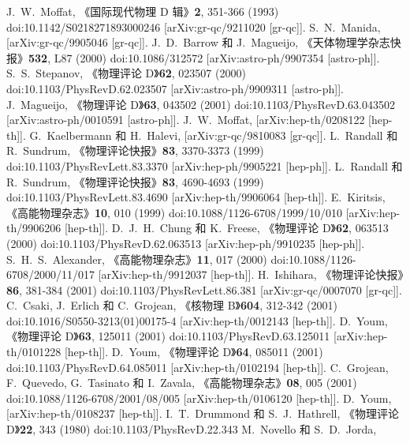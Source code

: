 \documentclass[jkps,preprint,fleqn]{revtex4}
\begin{document}
\begin{CJK*}{UTF8}{gbsn}
\begin{thebibliography}{999}
J.~W.~Moffat,
《国际现代物理 D 辑》\textbf{2}, 351-366 (1993)
doi:10.1142/S0218271893000246
[arXiv:gr-qc/9211020 [gr-qc]].
S.~N.~Manida,
[arXiv:gr-qc/9905046 [gr-qc]].
J.~D.~Barrow 和 J.~Magueijo,
《天体物理学杂志快报》\textbf{532}, L87 (2000)
doi:10.1086/312572
[arXiv:astro-ph/9907354 [astro-ph]].
S.~S.~Stepanov,
《物理评论 D》\textbf{62}, 023507 (2000)
doi:10.1103/PhysRevD.62.023507
[arXiv:astro-ph/9909311 [astro-ph]].
J.~Magueijo,
《物理评论 D》\textbf{63}, 043502 (2001)
doi:10.1103/PhysRevD.63.043502
[arXiv:astro-ph/0010591 [astro-ph]].
J.~W.~Moffat,
[arXiv:hep-th/0208122 [hep-th]].
G.~Kaelbermann 和 H.~Halevi,
[arXiv:gr-qc/9810083 [gr-qc]].
L.~Randall 和 R.~Sundrum,
《物理评论快报》\textbf{83}, 3370-3373 (1999)
doi:10.1103/PhysRevLett.83.3370
[arXiv:hep-ph/9905221 [hep-ph]].
L.~Randall 和 R.~Sundrum,
《物理评论快报》\textbf{83}, 4690-4693 (1999)
doi:10.1103/PhysRevLett.83.4690
[arXiv:hep-th/9906064 [hep-th]].
E.~Kiritsis,
《高能物理杂志》\textbf{10}, 010 (1999)
doi:10.1088/1126-6708/1999/10/010
[arXiv:hep-th/9906206 [hep-th]].
D.~J.~H.~Chung 和 K.~Freese,
《物理评论 D》\textbf{62}, 063513 (2000)
doi:10.1103/PhysRevD.62.063513
[arXiv:hep-ph/9910235 [hep-ph]].
S.~H.~S.~Alexander,
《高能物理杂志》\textbf{11}, 017 (2000)
doi:10.1088/1126-6708/2000/11/017
[arXiv:hep-th/9912037 [hep-th]].
H.~Ishihara,
《物理评论快报》\textbf{86}, 381-384 (2001)
doi:10.1103/PhysRevLett.86.381
[arXiv:gr-qc/0007070 [gr-qc]].
C.~Csaki, J.~Erlich 和 C.~Grojean,
《核物理 B》\textbf{604}, 312-342 (2001)
doi:10.1016/S0550-3213(01)00175-4
[arXiv:hep-th/0012143 [hep-th]].
D.~Youm,
《物理评论 D》\textbf{63}, 125011 (2001)
doi:10.1103/PhysRevD.63.125011
[arXiv:hep-th/0101228 [hep-th]].
D.~Youm,
《物理评论 D》\textbf{64}, 085011 (2001)
doi:10.1103/PhysRevD.64.085011
[arXiv:hep-th/0102194 [hep-th]].
C.~Grojean, F.~Quevedo, G.~Tasinato 和 I.~Zavala,
《高能物理杂志》\textbf{08}, 005 (2001)
doi:10.1088/1126-6708/2001/08/005
[arXiv:hep-th/0106120 [hep-th]].
D.~Youm,
[arXiv:hep-th/0108237 [hep-th]].
I.~T.~Drummond 和 S.~J.~Hathrell,
《物理评论 D》\textbf{22}, 343 (1980)
doi:10.1103/PhysRevD.22.343
M.~Novello 和 S.~D.~Jorda,

\end{thebibliography}
\end{CJK*}
\end{document}
